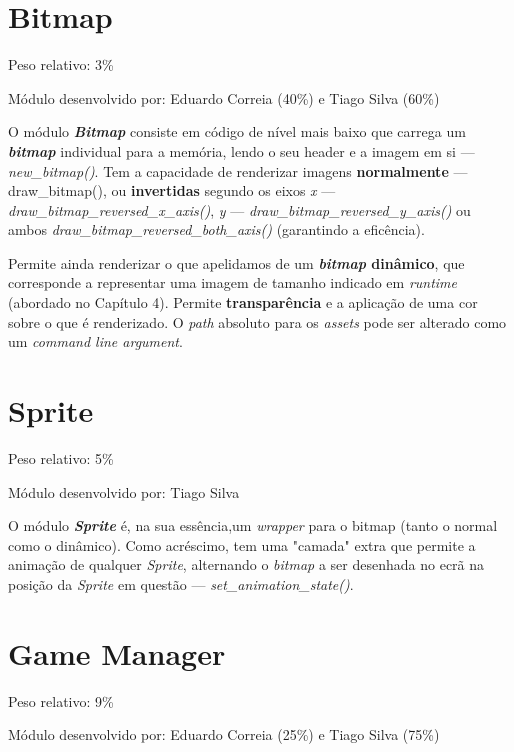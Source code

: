 \documentclass{report}
\begin{document}
\section{Bitmap} 

Peso relativo: 3\%

Módulo desenvolvido por: Eduardo Correia (40\%) e Tiago Silva (60\%)
\newline

O módulo \textbf{\textit{Bitmap}} consiste em código de nível mais baixo que carrega um \textbf{\textit{bitmap}} individual para a memória, lendo o seu header e a imagem em si --- \textit{new\_bitmap()}.
Tem a capacidade de renderizar imagens \textbf{normalmente} --- draw\_bitmap(), ou \textbf{invertidas} segundo os eixos \textit{x} --- \textit{draw\_bitmap\_reversed\_x\_axis()}, \textit{y} ---  \textit{draw\_bitmap\_reversed\_y\_axis()} ou ambos \textit{draw\_bitmap\_reversed\_both\_axis()} (garantindo a eficência).

Permite ainda renderizar o que apelidamos de um \textbf{\textit{bitmap} dinâmico}, que corresponde a representar uma imagem de tamanho indicado em \textit{runtime} (abordado no Capítulo 4).
Permite \textbf{transparência} e a aplicação de uma cor sobre o que é renderizado.
O \textit{path} absoluto para os \textit{assets} pode ser alterado como um \textit{command line argument}.
 
\section{Sprite}

Peso relativo: 5\%

Módulo desenvolvido por: Tiago Silva
\newline

O módulo \textbf{\textit{Sprite}} é, na sua essência,um \textit{wrapper} para o bitmap (tanto o normal como o dinâmico). Como acréscimo, tem uma "camada" extra que permite a animação de qualquer \textit{Sprite}, alternando o \textit{bitmap} a ser desenhada no ecrã na posição da \textit{Sprite} em questão --- \textit{set\_animation\_state()}.

\section{Game Manager}

Peso relativo: 9\%

Módulo desenvolvido por: Eduardo Correia (25\%) e Tiago Silva (75\%)
\newline
\end{document}

